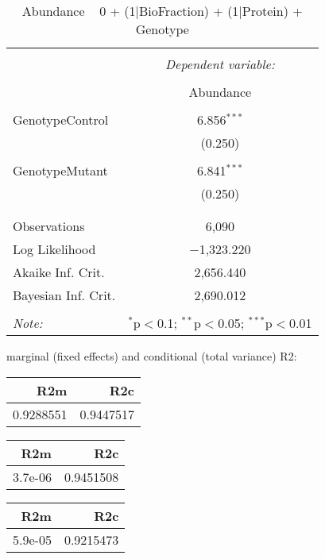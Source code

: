 \documentclass[11pt]{report}
\begin{document}
\begin{table}[!htbp] \centering 
  \caption{Abundance ~ 0 + (1|BioFraction) + (1|Protein) + Genotype} 
  \label{} 
\begin{tabular}{@{\extracolsep{5pt}}lc} 
\\[-1.8ex]\hline 
\hline \\[-1.8ex] 
 & \multicolumn{1}{c}{\textit{Dependent variable:}} \\ 
\cline{2-2} 
\\[-1.8ex] & Abundance \\ 
\hline \\[-1.8ex] 
 GenotypeControl & 6.856$^{***}$ \\ 
  & (0.250) \\ 
  & \\ 
 GenotypeMutant & 6.841$^{***}$ \\ 
  & (0.250) \\ 
  & \\ 
\hline \\[-1.8ex] 
Observations & 6,090 \\ 
Log Likelihood & $-$1,323.220 \\ 
Akaike Inf. Crit. & 2,656.440 \\ 
Bayesian Inf. Crit. & 2,690.012 \\ 
\hline 
\hline \\[-1.8ex] 
\textit{Note:}  & \multicolumn{1}{r}{$^{*}$p$<$0.1; $^{**}$p$<$0.05; $^{***}$p$<$0.01} \\ 
\end{tabular} 
\end{table} 
marginal (fixed effects) and conditional (total variance) R2:

\begin{tabular}{r|r}
\hline
R2m & R2c\\
\hline
0.9288551 & 0.9447517\\
\hline
\end{tabular}

\begin{tabular}{r|r}
\hline
R2m & R2c\\
\hline
3.7e-06 & 0.9451508\\
\hline
\end{tabular}

\begin{tabular}{r|r}
\hline
R2m & R2c\\
\hline
5.9e-05 & 0.9215473\\
\hline
\end{tabular}
\end{document}
